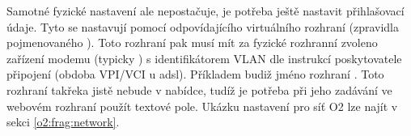 Samotné fyzické nastavení ale nepostačuje, je potřeba ještě nastavit přihlašovací
údaje. Tyto se nastavují pomocí odpovídajícího virtuálního rozhraní (zpravidla
pojmenovaného ). Toto rozhraní pak musí mít za fyzické rozhranní zvoleno
zařízení modemu (typicky ) s identifikátorem VLAN dle instrukcí poskytovatele
připojení (obdoba VPI/VCI u \gls{adsl}). Příkladem budiž jméno rozhraní
. Toto rozhraní takřeka jistě nebude v nabídce, tudíž je potřeba
při jeho zadávání ve webovém rozhraní použít textové pole. Ukázku nastavení
pro síť O2 lze najít v sekci \ref{o2:frag:network}.
